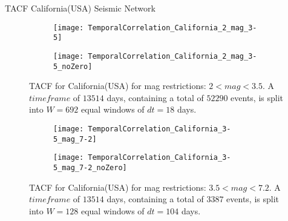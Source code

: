 \begin{frame}{TACF California(USA) Seismic Network}
\begin{figure}[!ht]
\begin{subfigure}{.5\textwidth}
  \centering
  \texttt{[image: TemporalCorrelation\_California\_2\_mag\_3-5]}
  \label{fig:corrCalifornia2_3.5}
\end{subfigure}%
\begin{subfigure}{.5\textwidth}
  \centering
  \texttt{[image: TemporalCorrelation\_California\_2\_mag\_3-5\_noZero]}
  \label{fig:corrCalifornia2_3.5_noZero}
\end{subfigure}
\caption{TACF for California(USA) for mag restrictions: $2<mag<3.5$. A $timeframe$ of $13514$ days, containing a total of $52290$ events, is split into $W=692$ equal windows of $dt=18$ days.}
\label{fig:corrCalifornia2_3.5!}
\end{figure}

\begin{figure}[!ht]
\begin{subfigure}{.5\textwidth}
  \centering
  \texttt{[image: TemporalCorrelation\_California\_3-5\_mag\_7-2]}
  \label{fig:corrCalifornia3.5_7}
\end{subfigure}%
\begin{subfigure}{.5\textwidth}
  \centering
  \texttt{[image: TemporalCorrelation\_California\_3-5\_mag\_7-2\_noZero]}
  \label{fig:corrCalifornia3.5_7_noZero}
\end{subfigure}
\caption{TACF for California(USA) for mag restrictions: $3.5<mag<7.2$. A $timeframe$ of $13514$ days, containing a total of $3387$ events, is split into $W=128$ equal windows of $dt=104$ days.}
\label{fig:corrCalifornia3.5_7!}
\end{figure}
\end{frame}


